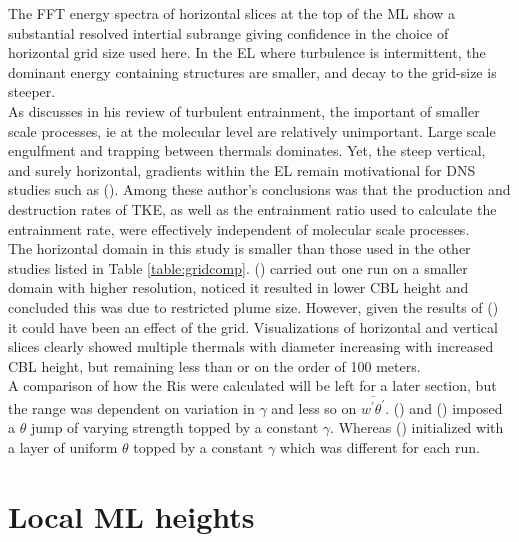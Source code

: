 The \acs{FFT} energy spectra of horizontal slices at the top of the \acs{ML} show a substantial resolved intertial subrange giving confidence in the choice of horizontal grid size used here. In the \acs{EL} where turbulence is intermittent, the dominant energy containing structures are smaller, and decay to the grid-size is steeper.\\

As \citeauthor{Turner86} discusses in his \citeyear{Turner86} review of turbulent entrainment, the important of smaller scale processes, ie at the molecular level are relatively unimportant.  Large scale engulfment and trapping between thermals dominates. Yet, the steep vertical, and surely horizontal, gradients within the \acs{EL} remain motivational for \acs{DNS} studies such as \citeauthor{GarciaMellado} (\citeyear{GarciaMellado}).  Among these author's conclusions was that the production and destruction rates of \acs{TKE}, as well as the entrainment ratio used to calculate the entrainment rate, were effectively independent of molecular scale processes.\\  

The horizontal domain in this study is smaller than those used in the other studies listed in Table \ref{table:gridcomp}. \citeauthor{SullMoengStev} (\citeyear{SullMoengStev}) carried out one run on a smaller domain with higher resolution, noticed it resulted in lower \acs{CBL} height and concluded this was due to restricted plume size. However, given the results of \citeauthor{SullPat} (\citeyear{SullPat}) it could have been an effect of the grid.  Visualizations of horizontal and vertical slices clearly showed multiple thermals with diameter increasing with increased \acs{CBL} height, but remaining less than or on the order of 100 meters.\\   

A comparison of how the \acs{Ri}s were calculated will be left for a later section, but the range was dependent on variation in $\gamma$ and less so on $\overline{w^{'}\theta^{'}}$.  \citeauthor{BrooksFowler2} (\citeyear{BrooksFowler2}) and \citeauthor{SullMoengStev} (\citeyear{SullMoengStev}) imposed a $\theta$ jump of varying strength topped by a constant $\gamma$.  Whereas \citeauthor{FedConzMir04} (\citeyear{FedConzMir04}) initialized with a layer of uniform $\theta$ topped by a constant $\gamma$ which was different for each run.\\    


\section{Local \acs{ML} heights}

